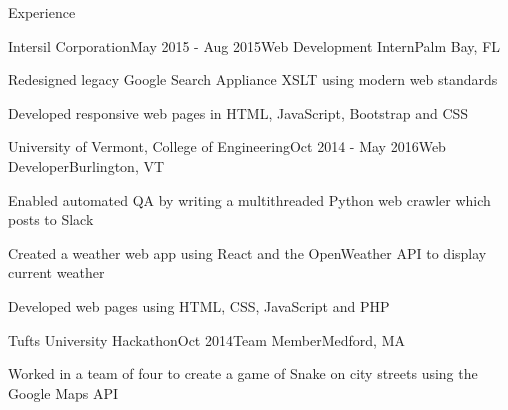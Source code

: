 \documentclass{resume} %
\begin{document}
\begin{rSection}{Experience}
\begin{rSubsection}{Intersil Corporation}{May 2015 - Aug 2015}{Web Development Intern}{Palm Bay, FL}
\item Redesigned legacy Google Search Appliance XSLT using modern web standards
\item Developed responsive web pages in HTML, JavaScript, Bootstrap and CSS

\end{rSubsection}


\begin{rSubsection}{University of Vermont, College of Engineering}{Oct 2014 - May 2016}{Web Developer}{Burlington, VT}

\item Enabled automated QA by writing a multithreaded Python web crawler which posts to Slack
\item Created a weather web app using React and the OpenWeather API to display current weather 
\item Developed web pages using HTML, CSS, JavaScript and PHP 

\end{rSubsection}





\begin{rSubsection}{Tufts University Hackathon}{Oct 2014}{Team Member}{Medford, MA}

\item Worked in a team of four to create a game of Snake on city streets using the Google Maps API

\end{rSubsection}

\end{rSection}

\end{document}
